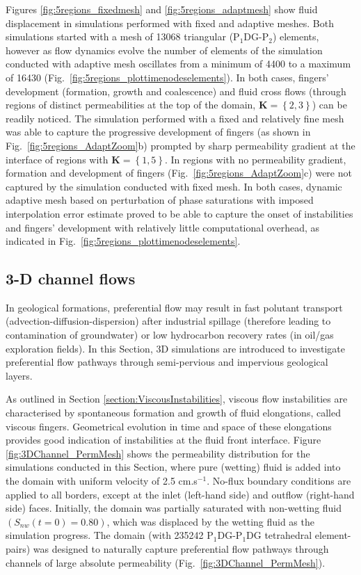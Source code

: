\documentclass[preprint,authoryear,12pt]{elsarticle}
\newcommand{\PN}[2][error]{P$_{#1}$DG-P$_{#2}$}
\newcommand{\PNDG}[2][error]{P$_{#1}$DG-P$_{#2}$DG}
\begin{document}
\medskip
Figures \ref{fig:5regions_fixedmesh} and \ref{fig:5regions_adaptmesh} show fluid displacement in simulations performed with fixed and adaptive meshes. Both simulations started with a mesh of 13068 triangular (\PN[1]{2}) elements, however as flow dynamics evolve the number of elements of the simulation conducted with adaptive mesh oscillates from a minimum of 4400 to a maximum of 16430 (Fig.~\ref{fig:5regions_plottimenodeselements}). In both cases, fingers' development (formation, growth and coalescence) and fluid cross flows (through regions of distinct permeabilities at the top of the domain, $\mathbf{K}=\left\{2,3\right\}$) can be readily noticed. The simulation performed with a fixed and relatively fine mesh was able to capture the progressive development of fingers (as shown in Fig.~\ref{fig:5regions_AdaptZoom}b) prompted by sharp permeability gradient at the interface of regions with $\mathbf{K}=\left\{1,5\right\}$. In regions with no permeability gradient, formation and development of fingers (Fig.~\ref{fig:5regions_AdaptZoom}c) were not captured by the simulation conducted with fixed mesh. In both cases, dynamic adaptive mesh based on perturbation of phase saturations with imposed interpolation error estimate proved to be able to capture the onset of instabilities and fingers' development with relatively little computational overhead, as indicated in Fig.~\ref{fig:5regions_plottimenodeselements}.   

\subsection{3-D channel flows} \label{section:results_3D} 
In geological formations, preferential flow may result in fast polutant transport (advection-diffusion-dispersion) after industrial spillage (therefore leading to contamination of groundwater) or low hydrocarbon recovery rates (in oil/gas exploration fields). In this Section, 3D simulations are introduced to investigate preferential flow pathways through semi-pervious and impervious geological layers. 

\medskip
As outlined in Section \ref{section:ViscousInstabilities}, viscous flow instabilities are characterised by spontaneous formation and growth of fluid elongations, called viscous fingers. Geometrical evolution in time and space of these elongations provides good indication of instabilities at the fluid front interface. Figure \ref{fig:3DChannel_PermMesh} shows the permeability distribution for the simulations conducted in this Section, where pure (wetting) fluid is added into the domain with uniform velocity of 2.5 cm.s$^{-1}$. No-flux boundary conditions are applied to all borders, except at the inlet (left-hand side) and outflow (right-hand side) faces. Initially, the domain was partially saturated with non-wetting fluid $\left(S_{nw}(t=0)=0.80\right)$, which was displaced by the wetting fluid as the simulation progress. The domain (with 235242 \PNDG[1]{1} tetrahedral element-pairs) was designed to naturally capture preferential flow pathways through channels of large absolute permeability (Fig.~\ref{fig:3DChannel_PermMesh}).%
\end{document}
